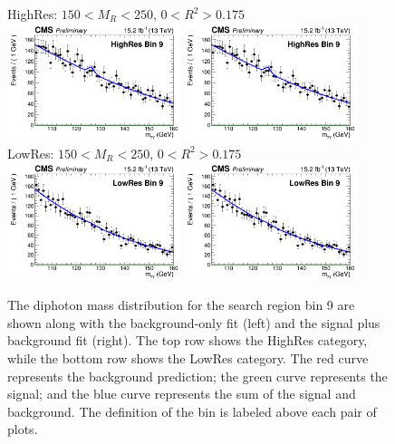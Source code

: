\begin{figure}[ht!]
\centering
HighRes: $150 < M_{R} < 250$\GeV, $0 < R^{2}>0.175$\\
\includegraphics[width=0.45\textwidth, angle=0.]{figs/unblindedResults2p3Plus12p9/highResBin9_fit_b.png}
\includegraphics[width=0.45\textwidth, angle=0.]{figs/unblindedResults2p3Plus12p9/highResBin9_fit_s.png}\\
LowRes: $150 < M_{R} < 250$\GeV, $0 < R^{2}>0.175$\\
\includegraphics[width=0.45\textwidth, angle=0.]{figs/unblindedResults2p3Plus12p9/lowResBin9_fit_b.png}
\includegraphics[width=0.45\textwidth, angle=0.]{figs/unblindedResults2p3Plus12p9/lowResBin9_fit_s.png}\\
\caption{ The diphoton mass distribution for the search region bin 9 
are shown along with the background-only fit (left) and the signal plus background fit (right).
The top row shows the HighRes category, while the bottom row shows the LowRes category.
The red curve represents the background prediction; the green curve represents the signal; 
and the blue curve represents the sum of the signal and background. The definition of the bin
is labeled above each pair of plots.
\label{fig:UnblindedResultsBin9}}
\end{figure}

